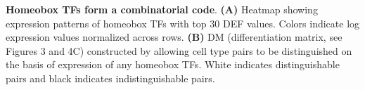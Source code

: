 \textbf{Homeobox TFs form a combinatorial code}.  
\textbf{(A)} Heatmap showing expression patterns of homeobox TFs with top 30 DEF values. Colors indicate log expression values normalized across rows. \textbf{(B)} DM (differentiation matrix, see Figures 3 and 4C) constructed by allowing cell type pairs to be distinguished on the basis of expression of any homeobox TFs. White indicates distinguishable pairs and black indicates indistinguishable pairs. 